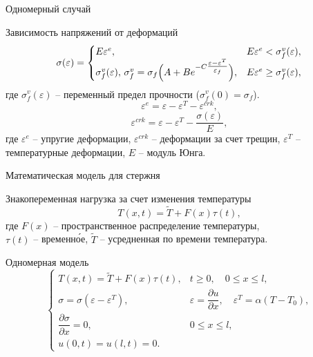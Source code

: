 \documentclass{beamer}
\begin{document}
	\begin{frame}{Одномерный случай}
	\begin{block}{Зависимость напряжений от деформаций}
	\begin{equation}
	\sigma(\varepsilon) = 
\begin{cases}
	E\varepsilon^e, & E\varepsilon^e < \sigma_f^v(\varepsilon), \\
	\sigma_f^v(\varepsilon),\,\sigma_f^v= \sigma_f\Bigl( A + B e^{-C \tfrac{\varepsilon-\varepsilon^T}{\varepsilon_f}} \Bigr), & E\varepsilon^e \geq \sigma_f^v(\varepsilon),
\end{cases}
\label{sigma}
	\end{equation}
\noindent где $\sigma_f^v(\varepsilon)$ -- переменный предел прочности ($\sigma_f^v(0) = \sigma_f$).
		\begin{equation}
\varepsilon^e = \varepsilon - \varepsilon^T-\varepsilon^{crk},
\end{equation}
		\begin{equation}
\varepsilon^{crk} = \varepsilon-\varepsilon^T-\frac{\sigma(\varepsilon)}{E},
	\end{equation}
где $\varepsilon^e$ -- упругие деформации, $\varepsilon^{crk}$ -- деформации за счет трещин, $\varepsilon^T$ -- температурные деформации, $E$ -- модуль Юнга.
\end{block}
	\end{frame}
	
		
	
	\begin{frame}{Математическая модель для стержня}
		\begin{block}{Знакопеременная нагрузка за счет изменения температуры}
\[
T(x,t) = \tilde T+F(x)\tau(t),
\]
где $F(x)$ -- пространственное распределение температуры,\\  $\tau(t)$ -- временн\'{о}е, $\tilde T$ -- усредненная по времени температура.
		\end{block}
		
		\begin{block}{Одномерная модель}
			\[
			\begin{cases}
				T(x, t) = \widetilde{T} + F(x) \tau(t), & t \geq 0, \quad 0 \leq x \leq l, \\[0.7em]
				\sigma = \sigma(\varepsilon - \varepsilon^T), & \varepsilon = \dfrac{\partial u}{\partial x}, \quad \varepsilon^T = \alpha(T - T_0), \\[0.7em]
				\dfrac{\partial \sigma}{\partial x} = 0, & 0 \leq x \leq l, \\[0.7em]
				u(0, t) = u(l, t) = 0.
			\end{cases}  
			\]
			
		\end{block}
	\end{frame}
	
\end{document}
